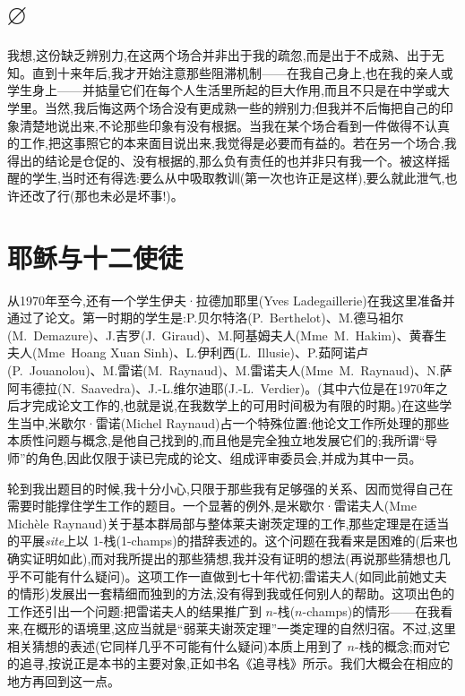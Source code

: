\section{$\varnothing$}

我想,这份缺乏辨别力,在这两个场合并非出于我的疏忽,而是出于不成熟、出于无知。直到十来年后,我才开始注意那些阻滞机制——在我自己身上,也在我的亲人或学生身上——并掂量它们在每个人生活里所起的巨大作用,而且不只是在中学或大学里。当然,我后悔这两个场合没有更成熟一些的辨别力;但我并不后悔把自己的印象清楚地说出来,不论那些印象有没有根据。当我在某个场合看到一件做得不认真的工作,把这事照它的本来面目说出来,我觉得是必要而有益的。若在另一个场合,我得出的结论是仓促的、没有根据的,那么负有责任的也并非只有我一个。被这样摇醒的学生,当时还有得选:要么从中吸取教训(第一次也许正是这样),要么就此泄气,也许还改了行(那也未必是坏事!)。

\section{耶稣与十二使徒}

从1970年至今,还有一个学生伊夫·拉德加耶里(Yves Ladegaillerie)在我这里准备并通过了论文。第一时期的学生是:P.贝尔特洛(P.~Berthelot)、M.德马祖尔(M.~Demazure)、J.吉罗(J.~Giraud)、M.阿基姆夫人(Mme~M.~Hakim)、黄春生夫人(Mme~Hoang Xuan Sinh)、L.伊利西(L.~Illusie)、P.茹阿诺卢(P.~Jouanolou)、M.雷诺(M.~Raynaud)、M.雷诺夫人(Mme~M.~Raynaud)、N.萨阿韦德拉(N.~Saavedra)、J.-L.维尔迪耶(J.-L.~Verdier)。(其中六位是在1970年之后才完成论文工作的,也就是说,在我数学上的可用时间极为有限的时期。)在这些学生当中,米歇尔·雷诺(Michel Raynaud)占一个特殊位置:他论文工作所处理的那些本质性问题与概念,是他自己找到的,而且他是完全独立地发展它们的;我所谓“导师”的角色,因此仅限于读已完成的论文、组成评审委员会,并成为其中一员。

轮到我出题目的时候,我十分小心,只限于那些我有足够强的关系、因而觉得自己在需要时能撑住学生工作的题目。一个显著的例外,是米歇尔·雷诺夫人(Mme Michèle Raynaud)关于基本群局部与整体莱夫谢茨定理的工作,那些定理是在适当的平展\emph{site}上以 1-栈(1-champs)的措辞表述的。这个问题在我看来是困难的(后来也确实证明如此),而对我所提出的那些猜想,我并没有证明的想法(再说那些猜想也几乎不可能有什么疑问)。这项工作一直做到七十年代初;雷诺夫人(如同此前她丈夫的情形)发展出一套精细而独到的方法,没有得到我或任何别人的帮助。这项出色的工作还引出一个问题:把雷诺夫人的结果推广到 $n$-栈($n$-champs)的情形——在我看来,在概形的语境里,这应当就是“弱莱夫谢茨定理”一类定理的自然归宿。不过,这里相关猜想的表述(它同样几乎不可能有什么疑问)本质上用到了 $n$-栈的概念;而对它的追寻,按说正是本书的主要对象,正如书名《追寻栈》所示。我们大概会在相应的地方再回到这一点。

